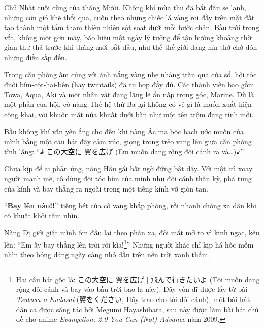 \documentclass[../main.tex]{subfiles}
\begin{document}

Chủ Nhật cuối cùng của tháng Mười. Không khí mùa thu đã bắt đầu se lạnh, những cơn gió khẽ thổi qua, cuốn theo những chiếc lá vàng rơi đầy trên mặt đất tạo thành một tấm thảm thiên nhiên sột soạt dưới mỗi bước chân. Bầu trời trong vắt, không một gợn mây, báo hiệu một ngày lý tưởng để tận hưởng khoảng thời gian thư thả trước khi tháng mới bắt đầu, như thể thế giới đang nín thở chờ đón những điều sắp đến.

Trong căn phòng ấm cúng với ánh nắng vàng nhẹ nhàng tràn qua cửa sổ, hội tóc đuôi bím-cột-hai-bên (hay twintails) đã tụ họp đầy đủ. Các thành viên bao gồm Towa, Aqua, Aki và một nhân vật đang lặng lẽ ẩn nấp trong góc, Marine. Dù là một phần của hội, cô nàng Thế hệ thứ Ba lại không có vẻ gì là muốn xuất hiện công khai, với khuôn mặt nửa khuất dưới bàn như một tên trộm đang rình mồi.

Bầu không khí vẫn yên ắng cho đến khi nàng Ác ma bộc bạch ước muốn của mình bằng một câu hát đầy cảm xúc, giọng trong trẻo vang lên giữa căn phòng tĩnh lặng:
``♪ この大空に 翼を広げ (Em muốn dang rộng đôi cánh ra và\dots)♪''

Chưa kịp để ai phản ứng, nàng Hầu gái bất ngờ đứng bật dậy. Với một cú xoay người mạnh mẽ, cô dùng đôi tóc bím của mình như đôi cánh thần kỳ, phá tung cửa kính và bay thẳng ra ngoài trong một tiếng kính vỡ giòn tan.


``\textbf{Bay lên nào!!}'' tiếng hét của cô vang khắp phòng, rồi nhanh chóng xa dần khi cô khuất khỏi tầm nhìn.

Nàng Dị giới giật mình ôm đầu lại theo phản xạ, đôi mắt mở to vì kinh ngạc, kêu lên: ``Em ấy bay thẳng lên trời rồi kìa!\footnote{Hai câu hát gốc là: この大空に 翼を広げ | 飛んで行きたいよ (Tôi muốn dang rộng đôi cánh và bay vào bầu trời bao la này). Đây vốn dĩ được lấy từ bài \textit{Tsubasa o Kudasai} (翼をください, Hãy trao cho tôi đôi cánh), một bài hát dân ca được sáng tác bởi Megumi Hayashibara, sau này được làm bài hát chủ đề cho anime \textit{Evangelion: 2.0 You Can (Not) Advance} năm 2009.}'' Những người khác chỉ kịp há hốc mồm nhìn theo bóng dáng ngày càng nhỏ dần trên nền trời xanh thẳm.
\end{document}
